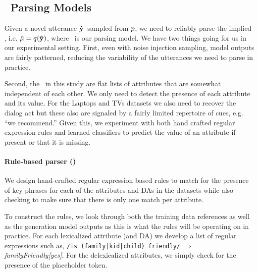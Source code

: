 \subsection{\MeaningRepresentation~Parsing Models}

Given a novel utterance $\boldsymbol{\hat{\mathbf{y}}}$~sampled from $p$, we need to 
reliably parse the implied \meaningrepresentation, i.e. 
$\hat{\mu} = q(\boldsymbol{\hat{\mathbf{y}}})$, 
where \dmodel~is our parsing model. We have two things going for us in 
our experimental setting. First, even with noise injection sampling,
model outputs are fairly patterned, reducing the variability of the utterances
we need to parse in practice. 

Second, the \meaningrepresentation~in this study are
flat lists of attributes that are somewhat independent of each other.
We only need to detect the presence of each attribute and its value.
For the Laptops and TVs datasets we also need to recover the dialog
act but these also are signaled by a fairly limited repertoire 
of cues, e.g. ``we recommend.'' %
Given this, we experiment with both hand crafted regular expression 
rules and learned classifiers to predict the value of
an attribute if present or that it is missing. 


\paragraph{Rule-based parser ()} We design hand-crafted 
regular expression based rules to match for the presence of key phrases 
for each of the attributes and DAs in the datasets while also checking to
make sure that there is only one match per attribute.

To construct the rules, we look through both the training data references as 
well as the generation model outputs as this is what the rules will
be operating on in practice. For each lexicalized attribute (and DA) we 
develop a list of regular expressions %
such as,
\texttt{/is (family|kid|child) friendly/} $\Rightarrow$ \textit{familyFriendly[yes]}.
For the delexicalized attributes, we simply check for the presence 
of the placeholder token. 


